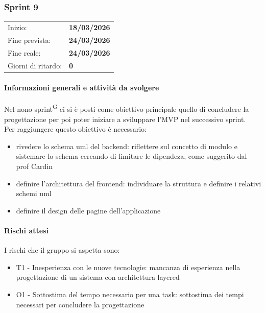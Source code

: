 \documentclass[a4paper, 11pt]{article}
\newcommand{\subsubsubsection}[1]{\paragraph{#1}}
\begin{document}
\newpage

\subsubsection{Sprint 9}
\begin{tabular}{ll}
	Inizio: & \textbf{18/03/2026} \\
	Fine prevista: & \textbf{24/03/2026} \\
	Fine reale: & \textbf{24/03/2026} \\
	Giorni di ritardo: & \textbf{0} \\
\end{tabular}

\subsubsubsection{Informazioni generali e attività da svolgere}
Nel nono sprint\textsuperscript{G} ci si è posti come obiettivo principale quello di concludere la progettazione
 per poi poter iniziare a sviluppare l'MVP nel successivo sprint. \\
Per raggiungere questo obiettivo è necessario:
\begin{itemize}
  \item rivedere lo schema uml del backend: riflettere sul concetto di modulo e sistemare lo schema cercando di limitare le dipendeza, come suggerito dal prof Cardin 
  \item definire l'architettura del frontend: individuare la struttura e definire i relativi schemi uml
  \item definire il design delle pagine dell'applicazione
\end{itemize}


\subsubsubsection{Rischi attesi}
I rischi che il gruppo si aspetta sono:
\begin{itemize}
	\item T1 - Inesperienza con le nuove tecnologie: mancanza di esperienza nella progettazione di un sistema con architettura layered
	\item O1 - Sottostima del tempo necessario per una task: sottostima dei tempi necessari per concludere la progettazione
\end{itemize}
\end{document}
